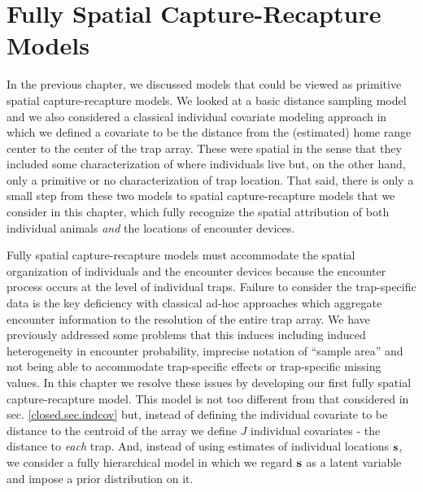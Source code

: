 




\chapter{Fully Spatial Capture-Recapture Models}
\label{chapt.scr0}

\vspace{.3in}

In the previous chapter, we discussed models that could be
viewed as primitive spatial capture-recapture models. We looked at a
basic distance sampling model and we also considered a classical
individual covariate modeling approach in which we defined a covariate
to be the distance from the (estimated) home range center to the center of
the trap array. These were spatial in the sense that they included
some characterization of where individuals live but, on the other
hand, only a primitive or no characterization of trap location.  That
said, there is only a small step from these two models to spatial
capture-recapture models that we consider in this chapter, which fully
recognize the spatial attribution of both individual animals {\it and}
the locations of encounter devices.

Fully spatial capture-recapture models must accommodate the spatial
organization of individuals and the encounter devices because the
encounter process occurs at the level of individual traps.  Failure to
consider the trap-specific data is the key deficiency
with classical ad-hoc approaches which aggregate encounter information
to the resolution of the entire trap array. We have  previously
addressed some problems that this induces including induced
heterogeneity in encounter probability, imprecise notation of ``sample
area'' and not being able to accommodate trap-specific
effects or trap-specific missing values.
In this chapter we resolve these issues by developing 
our first fully spatial capture-recapture
model. This model is not too different from
that considered in sec. \ref{closed.sec.indcov} but, 
instead of defining the individual covariate to be distance
to the centroid of the array we define $J$ individual covariates - the
distance to {\it each} trap. And, instead of using estimates of
individual locations ${\bf s}$, we consider a fully hierarchical model in
which we regard ${\bf s}$ as a latent variable and impose a prior
distribution on it.  

